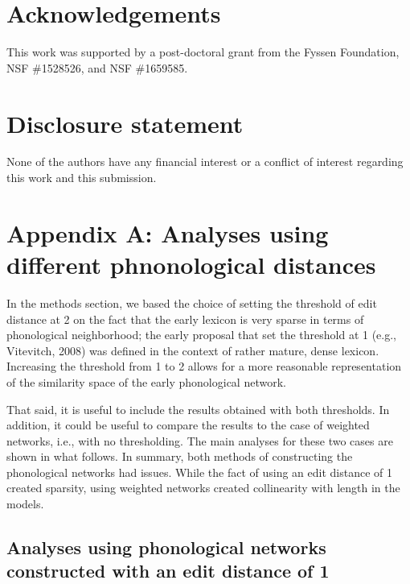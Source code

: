 \documentclass[english,floatsintext,man]{apa6}
\theoremstyle{definition}
\theoremstyle{definition}
\theoremstyle{definition}
\theoremstyle{remark}
\begin{document}
\vspace{1em}

\vspace{1em}

\section{Acknowledgements}\label{acknowledgements}

This work was supported by a post-doctoral grant from the Fyssen
Foundation, NSF \#1528526, and NSF \#1659585.

\section{Disclosure statement}\label{disclosure-statement}

None of the authors have any financial interest or a conflict of
interest regarding this work and this submission.

\clearpage

\section{Appendix A: Analyses using different phnonological
distances}\label{appendix-a-analyses-using-different-phnonological-distances}

In the methods section, we based the choice of setting the threshold of
edit distance at 2 on the fact that the early lexicon is very sparse in
terms of phonological neighborhood; the early proposal that set the
threshold at 1 (e.g., Vitevitch, 2008) was defined in the context of
rather mature, dense lexicon. Increasing the threshold from 1 to 2
allows for a more reasonable representation of the similarity space of
the early phonological network.

That said, it is useful to include the results obtained with both
thresholds. In addition, it could be useful to compare the results to
the case of weighted networks, i.e., with no thresholding. The main
analyses for these two cases are shown in what follows. In summary, both
methods of constructing the phonological networks had issues. While the
fact of using an edit distance of 1 created sparsity, using weighted
networks created collinearity with length in the models.

\subsection{Analyses using phonological networks constructed with an
edit distance of
1}\label{analyses-using-phonological-networks-constructed-with-an-edit-distance-of-1}
\end{document}
